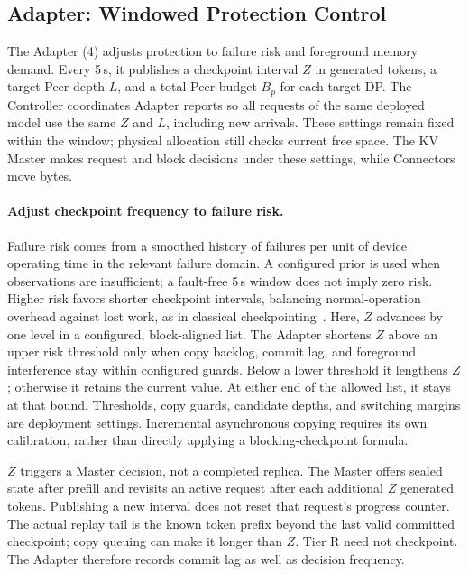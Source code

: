 \subsection{Adapter: Windowed Protection Control}
\label{sec:kv-runtime}
\label{sec:capacity-allocation}

The Adapter (4) adjusts protection to failure risk and foreground
memory demand. Every 5\,s, it publishes a checkpoint interval $Z$ in
generated tokens, a target Peer depth $L$, and a total Peer budget $B_p$
for each target DP. The Controller coordinates Adapter reports so all
requests of the same deployed model use the same $Z$ and $L$, including
new arrivals. These settings remain fixed within the window; physical
allocation still checks current free space. The KV Master makes request
and block decisions under these settings, while Connectors move bytes.

\paragraph{Adjust checkpoint frequency to failure risk.}
Failure risk comes from a smoothed history of failures per unit of
device operating time in the relevant failure domain. A configured
prior is used when observations are insufficient; a fault-free 5\,s
window does not imply zero risk. Higher risk favors shorter checkpoint
intervals, balancing normal-operation overhead against lost work, as in
classical checkpointing~\cite{daly2006checkpoint}. Here, $Z$ advances by
one level in a configured, block-aligned list. The Adapter shortens $Z$
above an upper risk threshold only when copy backlog, commit lag, and
foreground interference stay within configured guards. Below a lower
threshold it lengthens $Z$; otherwise it retains the current value.
At either end of the allowed list, it stays at that bound. Thresholds,
copy guards, candidate depths, and switching margins are deployment settings.
Incremental asynchronous copying requires its own calibration, rather
than directly applying a blocking-checkpoint formula.

$Z$ triggers a Master decision, not a completed replica. The Master
offers sealed state after prefill and revisits an active request after
each additional $Z$ generated tokens. Publishing a new interval does
not reset that request's progress counter. The actual replay tail is
the known token prefix beyond the last valid committed checkpoint;
copy queuing can make it longer than $Z$. Tier R need not checkpoint.
The Adapter therefore records commit lag as well as decision frequency.

